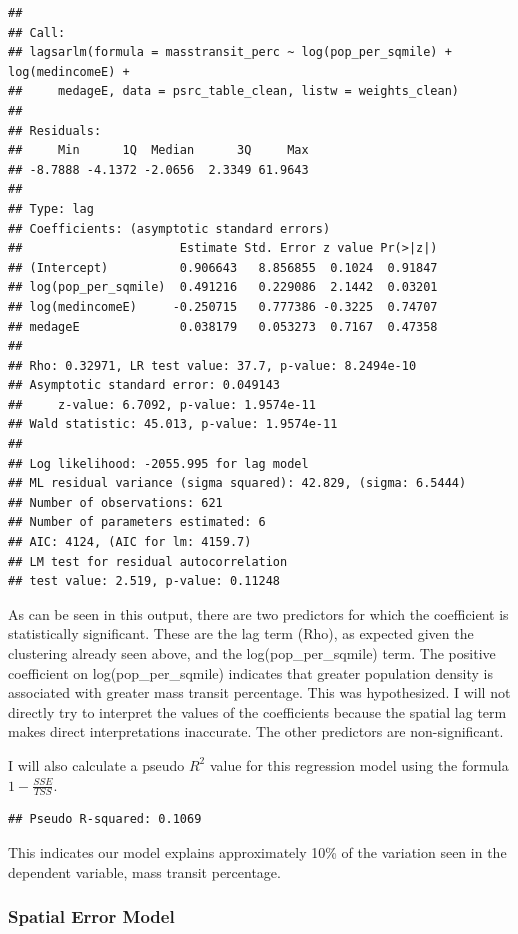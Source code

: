 \documentclass[
]{article}
\begin{document}
\begin{verbatim}
## 
## Call:
## lagsarlm(formula = masstransit_perc ~ log(pop_per_sqmile) + log(medincomeE) + 
##     medageE, data = psrc_table_clean, listw = weights_clean)
## 
## Residuals:
##     Min      1Q  Median      3Q     Max 
## -8.7888 -4.1372 -2.0656  2.3349 61.9643 
## 
## Type: lag 
## Coefficients: (asymptotic standard errors) 
##                      Estimate Std. Error z value Pr(>|z|)
## (Intercept)          0.906643   8.856855  0.1024  0.91847
## log(pop_per_sqmile)  0.491216   0.229086  2.1442  0.03201
## log(medincomeE)     -0.250715   0.777386 -0.3225  0.74707
## medageE              0.038179   0.053273  0.7167  0.47358
## 
## Rho: 0.32971, LR test value: 37.7, p-value: 8.2494e-10
## Asymptotic standard error: 0.049143
##     z-value: 6.7092, p-value: 1.9574e-11
## Wald statistic: 45.013, p-value: 1.9574e-11
## 
## Log likelihood: -2055.995 for lag model
## ML residual variance (sigma squared): 42.829, (sigma: 6.5444)
## Number of observations: 621 
## Number of parameters estimated: 6 
## AIC: 4124, (AIC for lm: 4159.7)
## LM test for residual autocorrelation
## test value: 2.519, p-value: 0.11248
\end{verbatim}

As can be seen in this output, there are two predictors for which the
coefficient is statistically significant. These are the lag term (Rho),
as expected given the clustering already seen above, and the
log(pop\_per\_sqmile) term. The positive coefficient on
log(pop\_per\_sqmile) indicates that greater population density is
associated with greater mass transit percentage. This was hypothesized.
I will not directly try to interpret the values of the coefficients
because the spatial lag term makes direct interpretations inaccurate.
The other predictors are non-significant.

I will also calculate a pseudo \(R^2\) value for this regression model
using the formula \(1 - \frac{SSE}{TSS}\).

\begin{verbatim}
## Pseudo R-squared: 0.1069
\end{verbatim}

This indicates our model explains approximately 10\% of the variation
seen in the dependent variable, mass transit percentage.

\subsubsection{Spatial Error Model}\label{spatial-error-model}
\end{document}
